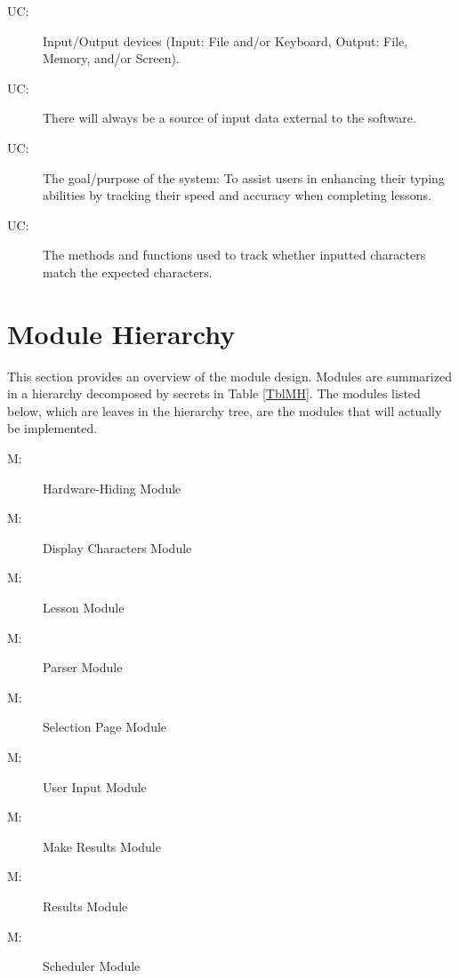 \documentclass[12pt, titlepage]{article}
\newcounter{ucnum}
\newcommand{\uctheucnum}{UC\theucnum}
\newcounter{mnum}
\newcommand{\mthemnum}{M\themnum}
\begin{document}
\begin{description}
\item[ \uctheucnum \label{ucIO}:] Input/Output devices (Input: File and/or Keyboard, Output: File, Memory, and/or Screen).
\item[ \uctheucnum \label{ucInput}:] There will always be a source of input data external to the software.
\item[ \uctheucnum \label{ucInput}:] The goal/purpose of the system: To assist users in enhancing their typing abilities by tracking their speed and accuracy when completing lessons. 
\item[ \uctheucnum \label{ucInput}:] The methods and functions used to track whether inputted characters match the expected characters. 
\end{description}

\section{Module Hierarchy} \label{SecMH}

This section provides an overview of the module design. Modules are summarized
in a hierarchy decomposed by secrets in Table \ref{TblMH}. The modules listed
below, which are leaves in the hierarchy tree, are the modules that will
actually be implemented.

\begin{description}
\item [ \mthemnum \label{mHH}:] Hardware-Hiding Module
\item [ \mthemnum \label{mDC}:] Display Characters Module
\item [ \mthemnum \label{mL}:] Lesson Module
\item [ \mthemnum \label{mP}:] Parser Module
\item [ \mthemnum \label{mSP}:] Selection Page Module
\item [ \mthemnum \label{mUI}:] User Input Module
\item [ \mthemnum \label{mMR}:] Make Results Module
\item [ \mthemnum \label{mR}:] Results Module
\item [ \mthemnum \label{mS}:] Scheduler Module
\end{description}
\end{document}
